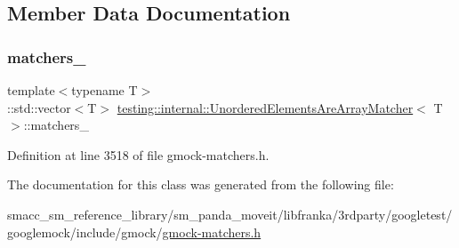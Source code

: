\subsection{Member Data Documentation}
\mbox{\label{classtesting_1_1internal_1_1UnorderedElementsAreArrayMatcher_ab671d76fb1e06755245814635a27c025}} 
\subsubsection{\texorpdfstring{matchers\+\_\+}{matchers\_}}
{\footnotesize\ttfamily template$<$typename T$>$ \\
\+::std\+::vector$<$T$>$ \hyperlink{classtesting_1_1internal_1_1UnorderedElementsAreArrayMatcher}{testing\+::internal\+::\+Unordered\+Elements\+Are\+Array\+Matcher}$<$ T $>$\+::matchers\+\_\+\hspace{0.3cm}{\ttfamily [private]}}



Definition at line 3518 of file gmock-\/matchers.\+h.



The documentation for this class was generated from the following file\+:\begin{DoxyCompactItemize}
\item 
smacc\+\_\+sm\+\_\+reference\+\_\+library/sm\+\_\+panda\+\_\+moveit/libfranka/3rdparty/googletest/googlemock/include/gmock/\hyperlink{gmock-matchers_8h}{gmock-\/matchers.\+h}\end{DoxyCompactItemize}
